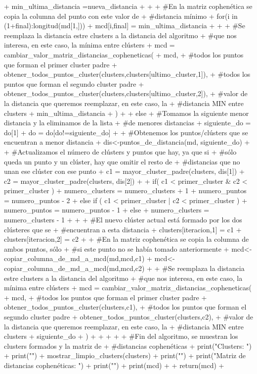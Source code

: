 \documentclass[parskip=full]{scrartcl}
\begin{document}
\begin{Schunk}
\begin{Sinput}
{{{{+     { min_ultima_distancia =nueva_distancia }
+   }
+   
+   #En la matriz cophenética se copia la columna del punto con este valor de 
+   #distancia mínimo
+   for(i in (1+final):longitud(md[1,])){
+     mcd[i,final] = min_ultima_distancia
+   }
+   
+   #Se reemplaza la distancia estre clusters a la distancia del algoritmo
+   #que nos interesa, en este caso, la mínima entre clústers
+   mcd = cambiar_valor_matriz_distancias_copheneticas(
+     mcd,
+     #todos los puntos que forman el primer cluster padre
+     obtener_todos_puntos_cluster(clusters,clusters[ultimo_cluster,1]), 
+     #todos los puntos que forman el segundo cluster padre
+     obtener_todos_puntos_cluster(clusters,clusters[ultimo_cluster,2]), 
+     #valor de la distancia que queremos reemplazar, en este caso, la
+     #distancia MIN entre clusters
+     min_ultima_distancia 
+   )
+   
+ } else {
+   #Tomamos la siguiente menor distancia y la eliminamos de la lista 
+   #de menores distancias
+   siguiente_do = do[1]
+   do = do[do!=siguiente_do]
+   
+   #Obtenemos los puntos/clústers que se encuentran a menor distancia
+   dis<-puntos_de_distancia(md, siguiente_do)
+   
+   #Actualizamos el número de clústers y puntos que hay, ya que si 
+   #sólo queda un punto y un clúster, hay que omitir el resto de 
+   #distancias que no unan ese clúster con ese punto
+   c1 = mayor_cluster_padre(clusters, dis[1])
+   c2 = mayor_cluster_padre(clusters, dis[2])
+   
+   if( c1 < primer_cluster & c2 < primer_cluster  ){
+     numero_clusters = numero_clusters + 1
+     numero_puntos = numero_puntos - 2
+   } else if ( c1 < primer_cluster | c2 < primer_cluster ) {
+     numero_puntos = numero_puntos - 1
+   } else {
+     numero_clusters = numero_clusters - 1
+   }
+   
+   #El nuevo clúster actual está formado por los dos clústeres que se
+   #encuentran a esta distancia
+   clusters[iteracion,1] = c1
+   clusters[iteracion,2] = c2
+   
+   #En la matriz cophenética se copia la columna de ambos puntos, sólo
+   #si este punto no se había tomado anteriormente
+   mcd<-copiar_columna_de_md_a_mcd(md,mcd,c1)
+   mcd<-copiar_columna_de_md_a_mcd(md,mcd,c2)
+   
+   #Se reemplaza la distancia estre clusters a la distancia del algoritmo
+   #que nos interesa, en este caso, la mínima entre clústers
+   mcd = cambiar_valor_matriz_distancias_copheneticas(
+     mcd,
+     #todos los puntos que forman el primer cluster padre
+     obtener_todos_puntos_cluster(clusters,c1), 
+     #todos los puntos que forman el segundo cluster padre
+     obtener_todos_puntos_cluster(clusters,c2),
+     #valor de la distancia que queremos reemplazar, en este caso, la
+     #distancia MIN entre clusters
+     siguiente_do 
+   )
+ }
+ 
+ }
+ 
+ #Fin del algoritmo, se muestran los clusters formados y la matriz de 
+ #distancias cophenéticas
+ print("Clusters: ")
+ print("")
+ mostrar_limpio_clusters(clusters)
+ print("")
+ print("Matriz de distancias cophenéticas: ")
+ print("")
+ print(mcd)
+ 
+ return(mcd)
+ }
\end{Sinput}
\end{Schunk}
\end{document}
